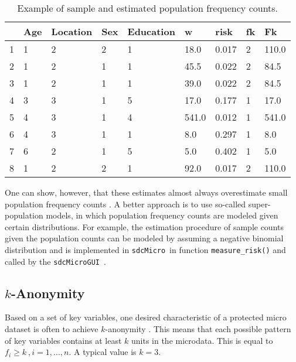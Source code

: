 \documentclass[12pt]{scrartcl}\usepackage[]{graphicx}\usepackage[]{color}
\newcommand{\sdcMicro}{\texttt{sdcMicro}}
\newcommand{\sdcMicroGUI}{\texttt{sdcMicroGUI}}
\begin{document}
\begin{small}
\begin{table}[ht]
\centering
\caption{Example of sample and estimated population frequency counts.} 
\label{listingFreq}
\begin{tabular}{|l|llll|l|l|ll|}
  \hline
 & Age & Location & Sex & Education & w & risk & fk & Fk \\ 
  \hline
1 & 1 & 2 & 2 & 1 & 18.0 & 0.017 & 2 & 110.0 \\ 
  2 & 1 & 2 & 1 & 1 & 45.5 & 0.022 & 2 & 84.5 \\ 
  3 & 1 & 2 & 1 & 1 & 39.0 & 0.022 & 2 & 84.5 \\ 
  4 & 3 & 3 & 1 & 5 & 17.0 & 0.177 & 1 & 17.0 \\ 
  5 & 4 & 3 & 1 & 4 & 541.0 & 0.012 & 1 & 541.0 \\ 
  6 & 4 & 3 & 1 & 1 & 8.0 & 0.297 & 1 & 8.0 \\ 
  7 & 6 & 2 & 1 & 5 & 5.0 & 0.402 & 1 & 5.0 \\ 
  8 & 1 & 2 & 2 & 1 & 92.0 & 0.017 & 2 & 110.0 \\ 
   \hline
\end{tabular}
\end{table}

\end{small}

One can show, however, that these estimates almost always overestimate small population frequency counts \citep[see, e.g.,][]{templ11book}. A better approach is to use so-called super-population models, in which population frequency counts are modeled given certain distributions. For example, the estimation procedure of sample counts given the population counts can be modeled by assuming a negative binomial distribution \citep[see][]{Rinott06} and is implemented in \sdcMicro~in function \lstinline{measure_risk()} \citep[see][]{sdcMicro} and called by the \sdcMicroGUI \ \citep{sdcMicroGUI}.

\subsection{$k$-Anonymity}\label{method:k_anonymity}
Based on a set of key variables, one desired characteristic of a protected micro dataset is often to achieve $k$-anonymity \citep{Samarati98,Samarati01,Sweeney02}. This means that each possible pattern of key variables contains at least $k$ units in the microdata. This is equal to $f_i \geq k \ , i=1,...,n$. A typical value is $k=3$. \\
\end{document}
